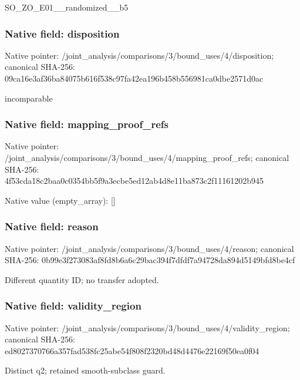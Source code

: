 \documentclass[10pt,a4paper]{article}
\begin{document}
\begingroup\raggedright\sloppy SO\_\allowbreak{}ZO\_\allowbreak{}E01\_\allowbreak{}\_\allowbreak{}randomized\_\allowbreak{}\_\allowbreak{}b5\par\endgroup

\subsubsection{Native field: disposition}
Native pointer: /joint\_\allowbreak{}analysis/comparisons/3/bound\_\allowbreak{}uses/4/disposition; canonical SHA-256: 09ca16e3af36ba84075b616f538c97fa42ea196b458b556981ca0dbe2571d0ac

\begingroup\raggedright\sloppy incomparable\par\endgroup

\subsubsection{Native field: mapping\_\allowbreak{}proof\_\allowbreak{}refs}
Native pointer: /joint\_\allowbreak{}analysis/comparisons/3/bound\_\allowbreak{}uses/4/mapping\_\allowbreak{}proof\_\allowbreak{}refs; canonical SHA-256: 4f53cda18c2baa0c0354bb5f9a3ecbe5ed12ab4d8e11ba873c2f11161202b945

Native value (empty\_\allowbreak{}array): []

\subsubsection{Native field: reason}
Native pointer: /joint\_\allowbreak{}analysis/comparisons/3/bound\_\allowbreak{}uses/4/reason; canonical SHA-256: 0b99e3f273083af8fd8b6a6c29bac394f7dfdf7a94728da894d5149bfd8be4cf

\begingroup\raggedright\sloppy Different quantity ID;\allowbreak{} no transfer adopted.\par\endgroup

\subsubsection{Native field: validity\_\allowbreak{}region}
Native pointer: /joint\_\allowbreak{}analysis/comparisons/3/bound\_\allowbreak{}uses/4/validity\_\allowbreak{}region; canonical SHA-256: ed8027370766a357fad538fc25abe54f808f2320bd48d4476e22169f50ea0f04

\begingroup\raggedright\sloppy Distinct q2;\allowbreak{} retained smooth-subclass guard.\par\endgroup
\end{document}
